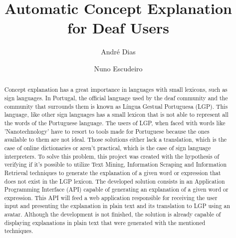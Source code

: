 \documentclass[runningheads]{llncs}
\begin{document}
%
\title{Automatic Concept Explanation for Deaf Users}
%
%
\author{André Dias \and
Nuno Escudeiro}
%
%
%
\maketitle              %
%
\begin{abstract}
    Concept explanation has a great importance in languages with small lexicons, such as sign languages.
    In Portugal, the official language used by the deaf community and the community that surrounds them is known as Língua Gestual Portuguesa (LGP).
    This language, like other sign languages has a small lexicon that is not able to represent all the words of the Portuguese language.
    The users of LGP, when faced with words like 'Nanotechnology' have to resort to tools made for Portuguese because the ones available to them are not ideal.
    Those solutions either lack a translation, which is the case of online dictionaries or aren't practical, which is the case of sign language interpreters.
    To solve this problem, this project was created with the hypothesis of verifying if it's possible to utilize Text Mining, Information Scraping and Information Retrieval techniques to generate the explanation of a given word or expression that does not exist in the LGP lexicon.
    The developed solution consists in an Application Programming Interface (API) capable of generating an explanation of a given word or expression.
    This API will feed a web application responsible for receiving the user input and presenting the explanation in plain text and its translation to LGP using an avatar.
    Although the development is not finished, the solution is already capable of displaying explanations in plain text that were generated with the mentioned techniques.

\end{abstract}
%
%
%
\end{document}
